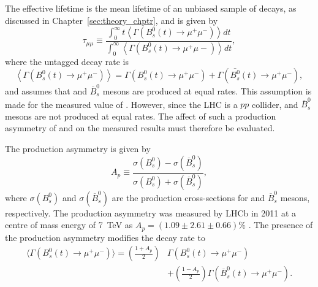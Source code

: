 The \bsmumu effective lifetime is the mean lifetime of an unbiased sample of \bsmumu decays, as discussed in Chapter~\ref{sec:theory_chptr}, and is given by
\begin{equation}
 \tau_{\mu\mu} \equiv \frac{\int^\infty_0 t \left<\Gamma \left( B^{0}_s(t) \rightarrow \mu^{+} \mu^{-} \right) \right> dt }{\int^\infty_0 \left<\Gamma \left( B^{0}_s(t) \rightarrow \mu^{+} \mu{-} \right) \right> dt },
\label{eq:el}
\end{equation}
where the untagged decay rate is
\begin{equation}
\left< \Gamma \left( B^0_s(t) \rightarrow \mu^{+} \mu^{-} \right)\right>  = \Gamma \left ( B^0_s(t) \rightarrow \mu^{+}\mu^{-} \right) + \Gamma \left ( \bar{B^0_s}(t) \rightarrow \mu^{+} \mu^{-} \right),
\end{equation}
and assumes that \bs and $\overline{B}^{0}_{s}$ mesons are produced at equal rates. This assumption is made for the measured value of \tmumu. However, since the LHC is a $pp$ collider, \bs and $\overline{B}^{0}_{s}$ mesons are not produced at equal rates. The affect of such a production asymmetry of \bs and on the measured results must therefore be evaluated. 

The production asymmetry is given by 
\begin{equation}
 A_{p} \equiv \frac{\sigma\left(B^{0}_{s}\right) - \sigma\left(\overline{B}^{0}_{s}\right)}{\sigma\left(B^{0}_{s}\right) + \sigma\left(\overline{B}^{0}_{s}\right)},
\label{eq:Ap}
\end{equation}
where $\sigma\left(B^{0}_{s}\right)$ and $\sigma\left(\overline{B}^{0}_{s}\right)$ are the production cross-sections for \bs and $\overline{B}^{0}_{s}$ mesons, respectively. The production asymmetry was measured by LHCb in 2011 at a centre of mass energy of 7~TeV as $ A_{p} = (1.09 \pm 2.61 \pm 0.66) \%$ \cite{Aaij:2014bba}. The presence of the production asymmetry modifies the \bsmumu decay rate to
\begin{align}
\langle \Gamma\left( B^0_s(t) \rightarrow \mu^{+}\mu^{-}\right) \rangle= \left(\frac{1+A_p}{2}\right)&\Gamma(B^0_s(t)\rightarrow \mu^{+} \mu^{-}) \nonumber \\
&  + \left(\frac{1-A_p}{2}\right)\Gamma(\overline{B}^0_s(t)\rightarrow \mu^{+} \mu^{-}).
\label{eq:modifieddecayrate}
\end{align}

